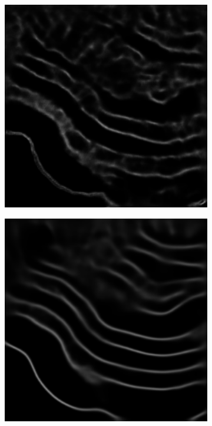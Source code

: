 \begin{figure}[!t]
\begin{subfigure}[t]{0.24\textwidth}
        \caption{}
    \end{subfigure}
    \begin{subfigure}[t]{0.24\textwidth}
        \centering
        \includegraphics[width=1\textwidth, valign=c]{images/abl-half.png}
        \caption{}
    \end{subfigure}
    \begin{subfigure}[t]{0.24\textwidth}
        \centering
        \includegraphics[width=1\textwidth, valign=c]{images/abl-forward.png}

\end{subfigure}
\end{figure}
